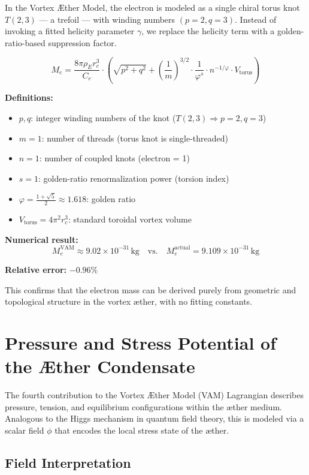 \documentclass[12pt]{article}
\begin{document}
In the Vortex Æther Model, the electron is modeled as a single chiral torus knot \( T(2,3) \) — a trefoil — with winding numbers \( (p = 2, q = 3) \). Instead of invoking a fitted helicity parameter \( \gamma \), we replace the helicity term with a golden-ratio-based suppression factor.

\[
\boxed{
M_e = \frac{8\pi \rho_{\scriptscriptstyle\boldsymbol\!E}r_c^3}{C_e} \cdot \left( \sqrt{p^2 + q^2} + \left( \frac{1}{m} \right)^{3/2} \cdot \frac{1}{\varphi^s} \cdot n^{-1/\varphi} \cdot V_{\text{torus}} \right)
}
\]

\textbf{Definitions:}
\begin{itemize}
  \item \( p, q \): integer winding numbers of the knot (\( T(2,3) \Rightarrow p = 2, q = 3 \))
  \item \( m = 1 \): number of threads (torus knot is single-threaded)
  \item \( n = 1 \): number of coupled knots (electron = 1)
  \item \( s = 1 \): golden-ratio renormalization power (torsion index)
  \item \( \varphi = \frac{1+\sqrt{5}}{2} \approx 1.618 \): golden ratio
  \item \( V_{\text{torus}} = 4\pi^2 r_c^3 \): standard toroidal vortex volume
\end{itemize}

\textbf{Numerical result:}
\[
M_e^{\text{VAM}} \approx 9.02 \times 10^{-31} \, \text{kg}
\quad \text{vs.} \quad
M_e^{\text{actual}} = 9.109 \times 10^{-31} \, \text{kg}
\]

\textbf{Relative error:} \( -0.96\% \)

This confirms that the electron mass can be derived purely from geometric and topological structure in the vortex æther, with no fitting constants.
\section{Pressure and Stress Potential of the Æther Condensate}

The fourth contribution to the Vortex \AE{}ther Model (VAM) Lagrangian describes pressure, tension, and equilibrium configurations within the æther medium. Analogous to the Higgs mechanism in quantum field theory, this is modeled via a scalar field $\phi$ that encodes the local stress state of the æther.

\subsection*{Field Interpretation}
\end{document}
